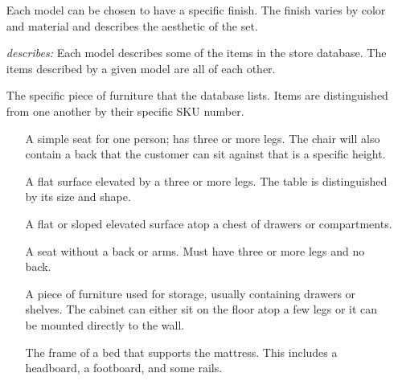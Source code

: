 \documentclass[american,extrafontsizes,12pt,portrait,letterpaper,oneside,onecolumn,article,final]{memoir}
\begin{document}
\begin{enumerate}[leftmargin=*,widest={\strong{Distribution Center:}}]
\item[\strong{\hypertarget{Finish}{Finish}:}]
%
Each model can be chosen to have a specific finish.
The finish varies by color and material and describes the aesthetic of the set.

\item[\emph{\hypertarget{Model-Item-rel}{describes}:}]
%
Each model describes some of the items in the store database.
The items described by a given model are all  of each other.

\item[\strong{\hypertarget{Item}{Item}:}]
%
The specific piece of furniture that the database lists.
Items are distinguished from one another by their specific SKU number.

\begin{enumerate}[leftmargin=*,widest={\strong{Bedframe:}}]

\item[\strong{\hypertarget{Chair}{Chair}:}]
%
A simple seat for one person; has three or more legs.
The chair will also contain a back that the customer can sit against that is a specific height.

\item[\strong{\hypertarget{Table}{Table}:}]
%
A flat surface elevated by a three or more legs.
The table is distinguished by its size and shape.

\item[\strong{\hypertarget{Desk}{Desk}:}]
%
A flat or sloped elevated surface atop a chest of drawers or compartments.

\item[\strong{\hypertarget{Stool}{Stool}:}]
%
A seat without a back or arms.
Must have three or more legs and no back.

\item[\strong{\hypertarget{Cabinet}{Cabinet}:}]
%
A piece of furniture used for storage, usually containing drawers or shelves.
The cabinet can either sit on the floor atop a few legs or it can be mounted directly to the wall.

\item[\strong{\hypertarget{Bedframe}{Bedframe}:}]
%
The frame of a bed that supports the mattress.
This includes a headboard, a footboard, and some rails.
\end{enumerate}


\end{enumerate}
\end{document}

